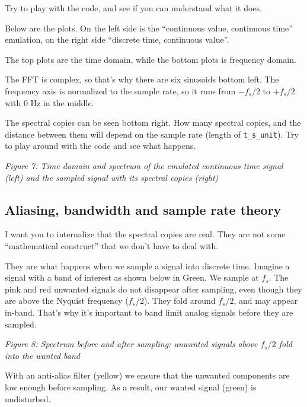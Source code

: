Try to play with the code, and see if you can understand what it does.

Below are the plots. On the left side is the ``continuous value,
continuous time'' emulation, on the right side ``discrete time,
continuous value''.

The top plots are the time domain, while the bottom plots is frequency
domain.

The FFT is complex, so that's why there are six sinusoids bottom left.
The frequency axis is normalized to the sample rate, so it runs from
\(-f_s/2\) to \(+f_s/2\) with 0 Hz in the middle.

The spectral copies can be seen bottom right. How many spectral copies,
and the distance between them will depend on the sample rate (length of
\texttt{t\_s\_unit}). Try to play around with the code and see what
happens.


{
\centering
{}
}

\emph{Figure 7: Time domain and spectrum of the emulated continuous time
signal (left) and the sampled signal with its spectral copies (right)}

\subsection{Aliasing, bandwidth and sample rate
theory}\label{aliasing-bandwidth-and-sample-rate-theory}

I want you to internalize that the spectral copies are real. They are
not some ``mathematical construct'' that we don't have to deal with.

They are what happens when we sample a signal into discrete time.
Imagine a signal with a band of interest as shown below in Green. We
sample at \(f_s\). The pink and red unwanted signals do not disappear
after sampling, even though they are above the Nyquist frequency
(\(f_s/2\)). They fold around \(f_s/2\), and may appear in-band. That's
why it's important to band limit analog signals before they are sampled.


{
\centering
{}
}

\emph{Figure 8: Spectrum before and after sampling: unwanted signals
above \(f_s/2\) fold into the wanted band}

With an anti-alias filter (yellow) we ensure that the unwanted
components are low enough before sampling. As a result, our wanted
signal (green) is undisturbed.


{
\centering
{}
}

